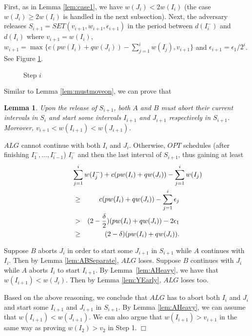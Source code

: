 \documentclass[11pt]{article}
\newtheorem{lemma}{Lemma}[section]
\newcommand{\qed}{\hspace*{\fill}$\Box$\par\medskip}
\newenvironment{proof}{\noindent{\it Proof. }\ignorespaces}{\qed}
\begin{document}
First, as in Lemma \ref{lem:case1}, we have $w(J_i) < 2 w(I_i)$
(the case $w(J_i) \ge 2 w(I_i)$ is handled in the next subsection). 
Next, the adversary releases $S_{i+1} = SET(v_{i+1}, w_{i+1}, \epsilon_{i+1})$ 
in the period between $d(I^-_i)$ and $d(I_i)$
where $v_{i+1} = w(I_i)$,
$w_{i+1} = \max\{ c(p w(I_i) + q w(J_i)) - \sum_{j=1}^i w(I_j), v_{i+1}\}$
and $\epsilon_{i+1} = \epsilon_1/2^i$.
See Figure \ref{fig:stepi}.

\begin{figure}
\centerline{ \epsfysize=1.3in  }
\caption{Step $i$}
\label{fig:stepi}
\end{figure}

Similar to Lemma \ref{lem:mustmoveon}, we can prove that

\begin{lemma} 
Upon the release of $S_{i+1}$,
both $A$ and $B$ must abort their current intervals in $S_i$
and start some intervals $I_{i+1}$ and $J_{i+1}$ respectively in $S_{i+1}$.
Moreover, $v_{i+1} < w(I_{i+1}) < w(J_{i+1})$.
\end{lemma}

\begin{proof}
$ALG$ cannot continue with both $I_i$ and $J_i$.
Otherwise, $OPT$ schedules (after finishing $I_1^-, \ldots, I_{i-1}^-$)
$I_i^-$ and then the last interval of $S_{i+1}$,
thus gaining at least
\begin{eqnarray*}
\lefteqn{ \sum_{j=1}^i w(I_j^-)      
            + c( p w(I_i) + q w(J_i)) - \sum_{j=1}^i w(I_j) } \\
  & \geq & c (p w(I_i) + q w(J_i)) - \sum_{j=1}^i \epsilon_j  \\
  &  >   & (2-\frac{\delta}{2}) (p w(I_i) + q w(J_i)) - 2\epsilon_1   \\
  & \geq & (2-\delta) (p w(I_i) + q w(J_i)).
\end{eqnarray*}

Suppose $B$ aborts $J_i$ in order to start some $J_{i+1}$ in $S_{i+1}$ 
while $A$ continues with $I_i$.
Then by Lemma \ref{lem:ABSeparate}, $ALG$ loses.
Suppose $B$ continues with $J_i$ while
$A$ aborts $I_i$ to start $I_{i+1}$.
By Lemma~\ref{lem:AHeavy}, we have that $w(I_{i+1}) < w(J_i)$.
Then by Lemma \ref{lem:YEarly}, $ALG$ loses too.

Based on the above reasoning, we conclude that $ALG$ has to abort
both $I_i$ and $J_i$ and start some $I_{i+1}$ and $J_{i+1}$ in $S_{i+1}$.
By Lemma \ref{lem:AHeavy}, we can assume that $w(I_{i+1}) < w(J_{i+1})$.
We can also argue that $w(I_{i+1}) > v_{i+1}$ in the same way as proving
$w(I_2) > v_2$ in Step 1.
\end{proof}
\end{document}
